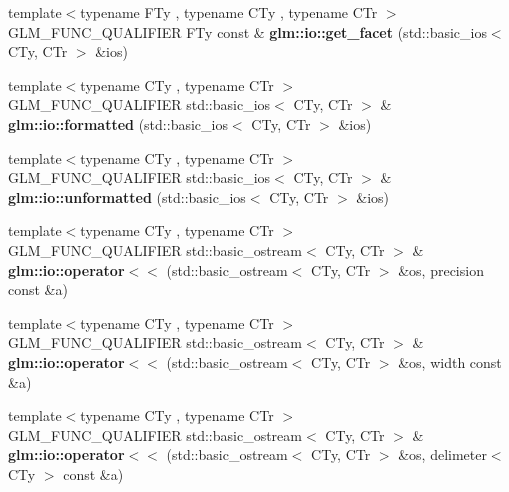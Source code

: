 \begin{DoxyCompactItemize}
\item 
\mbox{\label{io_8inl_a9e8927cf032254b0eee4ec650286e1f9}} 
{\footnotesize template$<$typename F\+Ty , typename C\+Ty , typename C\+Tr $>$ }\\G\+L\+M\+\_\+\+F\+U\+N\+C\+\_\+\+Q\+U\+A\+L\+I\+F\+I\+ER F\+Ty const  \& {\bfseries glm\+::io\+::get\+\_\+facet} (std\+::basic\+\_\+ios$<$ C\+Ty, C\+Tr $>$ \&ios)
\item 
\mbox{\label{io_8inl_aa31ec433f6039e5bd35f0f58b37bef83}} 
{\footnotesize template$<$typename C\+Ty , typename C\+Tr $>$ }\\G\+L\+M\+\_\+\+F\+U\+N\+C\+\_\+\+Q\+U\+A\+L\+I\+F\+I\+ER std\+::basic\+\_\+ios$<$ C\+Ty, C\+Tr $>$ \& {\bfseries glm\+::io\+::formatted} (std\+::basic\+\_\+ios$<$ C\+Ty, C\+Tr $>$ \&ios)
\item 
\mbox{\label{io_8inl_a8f950faa7ad67cac1287beaf896a8bb6}} 
{\footnotesize template$<$typename C\+Ty , typename C\+Tr $>$ }\\G\+L\+M\+\_\+\+F\+U\+N\+C\+\_\+\+Q\+U\+A\+L\+I\+F\+I\+ER std\+::basic\+\_\+ios$<$ C\+Ty, C\+Tr $>$ \& {\bfseries glm\+::io\+::unformatted} (std\+::basic\+\_\+ios$<$ C\+Ty, C\+Tr $>$ \&ios)
\item 
\mbox{\label{io_8inl_ac52a8c5f8ea189f5bae2e5b8e382675f}} 
{\footnotesize template$<$typename C\+Ty , typename C\+Tr $>$ }\\G\+L\+M\+\_\+\+F\+U\+N\+C\+\_\+\+Q\+U\+A\+L\+I\+F\+I\+ER std\+::basic\+\_\+ostream$<$ C\+Ty, C\+Tr $>$ \& {\bfseries glm\+::io\+::operator$<$$<$} (std\+::basic\+\_\+ostream$<$ C\+Ty, C\+Tr $>$ \&os, precision const \&a)
\item 
\mbox{\label{io_8inl_ac4783e4e3b0384619625d5d2d00c27b8}} 
{\footnotesize template$<$typename C\+Ty , typename C\+Tr $>$ }\\G\+L\+M\+\_\+\+F\+U\+N\+C\+\_\+\+Q\+U\+A\+L\+I\+F\+I\+ER std\+::basic\+\_\+ostream$<$ C\+Ty, C\+Tr $>$ \& {\bfseries glm\+::io\+::operator$<$$<$} (std\+::basic\+\_\+ostream$<$ C\+Ty, C\+Tr $>$ \&os, width const \&a)
\item 
\mbox{\label{io_8inl_a7c5774d5b7b03ff810042e141d893082}} 
{\footnotesize template$<$typename C\+Ty , typename C\+Tr $>$ }\\G\+L\+M\+\_\+\+F\+U\+N\+C\+\_\+\+Q\+U\+A\+L\+I\+F\+I\+ER std\+::basic\+\_\+ostream$<$ C\+Ty, C\+Tr $>$ \& {\bfseries glm\+::io\+::operator$<$$<$} (std\+::basic\+\_\+ostream$<$ C\+Ty, C\+Tr $>$ \&os, delimeter$<$ C\+Ty $>$ const \&a)

\end{DoxyCompactItemize}
